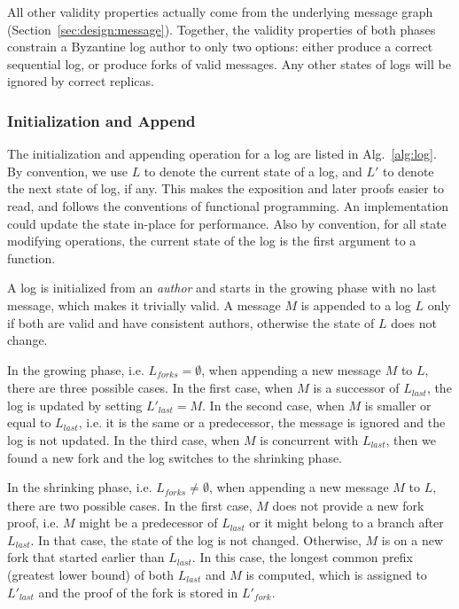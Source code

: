 \documentclass[9pt, oneside]{article}   	%
\begin{document}
All other validity properties actually come from the underlying message graph (Section~\ref{sec:design:message}). Together, the validity properties of both phases constrain a Byzantine log author to only two options: either produce a correct sequential log, or produce forks of valid messages. Any other states of logs will be ignored by correct replicas.

\subsubsection{Initialization and Append}
\label{sec:design:log:appending}

The initialization and appending operation for a log are listed in Alg.~\ref{alg:log}. By convention, we use $L$ to denote the current state of a log, and $L'$ to denote the next state of log, if any. This makes the exposition and later proofs easier to read, and follows the conventions of functional programming. An implementation could update the state in-place for performance. Also by convention, for all state modifying operations, the current state of the log is the first argument to a function.

 A log is initialized from an \textit{author} and starts in the growing phase with no last message, which makes it trivially valid. A message $M$ is appended to a log $L$ only if both are valid and have consistent authors, otherwise the state of $L$ does not change. 

In the growing phase, i.e. $L_\textit{forks} = \emptyset$, when appending a new message $M$ to $L$, there are three possible cases. In the first case, when $M$ is a successor of $L_\textit{last}$, the log is updated by setting $L'_\textit{last} = M$. In the second case, when $M$ is smaller or equal to $L_\textit{last}$, i.e. it is the same or a predecessor, the message is ignored and the log is not updated. In the third case, when $M$ is concurrent with $L_\textit{last}$, then we found a new fork and the log switches to the shrinking phase.

In the shrinking phase, i.e. $L_\textit{forks} \neq \emptyset$, when appending a new message $M$ to $L$, there are two possible cases. In the first case, $M$ does not provide a new fork proof, i.e. $M$ might be a predecessor of $L_\textit{last}$ or it might belong to a branch after $L_\textit{last}$. In that case, the state of the log is not changed. Otherwise, $M$ is on a new fork that started earlier than $L_\textit{last}$. In this case, the longest common prefix (greatest lower bound) of both $L_\textit{last}$ and $M$ is computed, which is assigned to $L'_\textit{last}$ and the proof of the fork is stored in $L'_\textit{fork}$.
\end{document}
